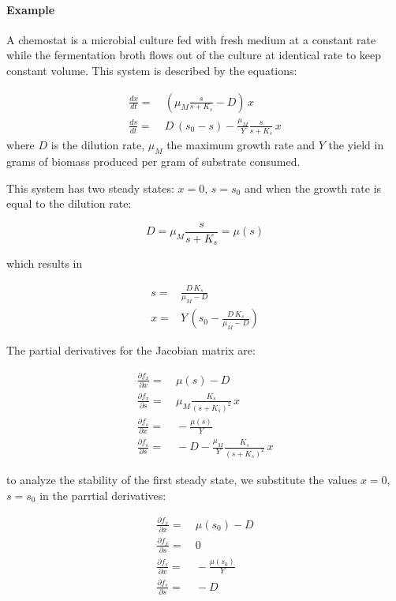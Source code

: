 \documentclass{tufte-book} %
\begin{document}
\paragraph{Example} A chemostat is a microbial culture fed with fresh medium at a constant rate while the fermentation broth flows out of the culture at identical rate to keep constant volume. This system is described by the equations:

\begin{align}
	\frac{dx}{dt}=&\: \left( \mu_M \frac{s}{s+K_s} - D\right) \, x  \nonumber\\
	\frac{ds}{dt}=&\: D\, (s_0-s)-\frac{\mu_M}{Y} \frac{s}{s+K_s}\,x \nonumber
\end{align}
where $D$ is the dilution rate, $\mu_M$ the maximum growth rate and $Y$ the yield in grams of biomass produced per gram of substrate consumed.

This system has two steady states: $x=0$, $s=s_0$ and when the growth rate is equal to the dilution rate:

 \begin{equation}
	D = \mu_M \frac{s}{s+K_s} = \mu(s) \nonumber
\end{equation}

which results in 

\begin{align}
	s=& \frac{D \, K_s}{\mu_M - D} \nonumber \\
	x=& Y \, \left( s_0 - \frac{D \, K_s}{\mu_M - D} \right) \nonumber
\end{align}

The partial derivatives for the Jacobian matrix are:

\begin{align}
	\frac{\partial f_x}{\partial x }=&\:   \mu(s) - D  \nonumber\\
	\frac{\partial f_x}{\partial s }=&\: \mu_M \frac{K_s}{(s+K_s)^2} \, x   \nonumber\\
	\frac{\partial f_s}{\partial x }=&\: - \frac{\mu(s)}{Y}  \nonumber\\
	\frac{\partial f_s}{\partial s }=&\: - D -   \frac{\mu_M}{Y} \frac{K_s}{(s+K_s)^2} \, x  \nonumber
\end{align}

to analyze the stability of the first steady state, we substitute the values $x=0$, $s=s_0$ in the parrtial derivatives:

\begin{align}
	\frac{\partial f_x}{\partial x }=&\:    \mu(s_0) - D  \nonumber\\
	\frac{\partial f_x}{\partial s }=&\: 0  \nonumber\\
	\frac{\partial f_s}{\partial x }=&\:  - \frac{\mu(s_0)}{Y} \nonumber\\
	\frac{\partial f_s}{\partial s }=&\: - D   \nonumber
\end{align}
\end{document}
